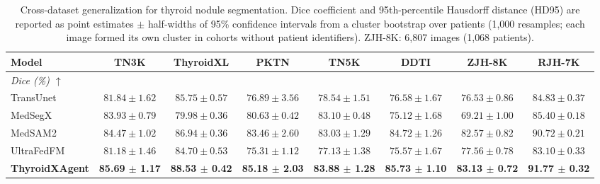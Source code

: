 \begin{table}[p]
\centering
\begin{threeparttable}

\caption{Cross-dataset generalization for thyroid nodule segmentation. Dice coefficient and 95th-percentile Hausdorff distance (HD95) are reported as point estimates $\pm$ half-widths of 95\% confidence intervals from a cluster bootstrap over patients (1{,}000 resamples; each image formed its own cluster in cohorts without patient identifiers). ZJH-8K: 6{,}807 images (1{,}068 patients).}
\label{tab:seg_performance}

\footnotesize
\setlength{\tabcolsep}{5.5pt}
\renewcommand{\arraystretch}{1.08}

\begin{tabular}{lccccccc}
\toprule
\textbf{Model}
& \textbf{TN3K}
& \textbf{ThyroidXL}
& \textbf{PKTN}
& \textbf{TN5K}
& \textbf{DDTI}
& \textbf{ZJH-8K}
& \textbf{RJH-7K} \\
\midrule
\multicolumn{8}{l}{\textit{Dice (\%) $\uparrow$}} \\
\midrule
TransUnet~\cite{chen2024transunet}
& $81.84 \pm 1.62$
& $85.75 \pm 0.57$
& $76.89 \pm 3.56$
& $78.54 \pm 1.51$
& $76.58 \pm 1.67$
& $76.53 \pm 0.86$
& $84.83 \pm 0.37$ \\
MedSegX~\cite{zhang2025generalist}
& $83.93 \pm 0.79$
& $79.98 \pm 0.36$
& $80.63 \pm 0.42$
& $83.10 \pm 0.48$
& $75.12 \pm 1.68$
& $69.21 \pm 1.00$
& $85.40 \pm 0.18$ \\
MedSAM2~\cite{ma2025medsam2}
& $84.47 \pm 1.02$
& $86.94 \pm 0.36$
& $83.46 \pm 2.60$
& $83.03 \pm 1.29$
& $84.72 \pm 1.26$
& $82.57 \pm 0.82$
& $90.72 \pm 0.21$ \\
UltraFedFM~\cite{jiang2025pretraining}
& $81.18 \pm 1.46$
& $84.70 \pm 0.53$
& $75.31 \pm 1.12$
& $77.13 \pm 1.38$
& $75.57 \pm 1.67$
& $77.56 \pm 0.78$
& $83.10 \pm 0.33$ \\
\rowcolor{lightgray}
\textbf{ThyroidXAgent}
& \textbf{85.69 $\pm$ 1.17}
& \textbf{88.53 $\pm$ 0.42}
& \textbf{85.18 $\pm$ 2.03}
& \textbf{83.88 $\pm$ 1.28}
& \textbf{85.73 $\pm$ 1.10}
& \textbf{83.13 $\pm$ 0.72}
& \textbf{91.77 $\pm$ 0.32} \\


\end{tabular}
\end{threeparttable}
\end{table}
